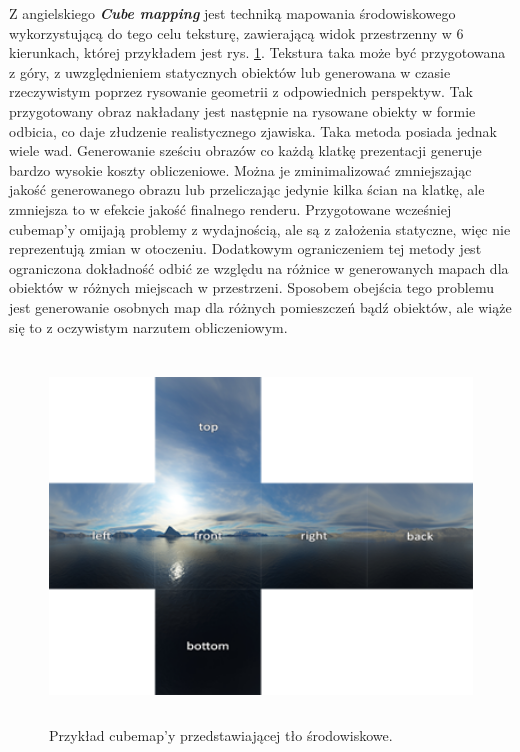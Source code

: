 \begin{itemize}
	Z angielskiego \emph{\textbf{Cube mapping}} jest techniką mapowania środowiskowego wykorzystującą do tego celu teksturę, zawierającą widok przestrzenny w 6 kierunkach, której przykładem jest rys. \ref{intro-cubemap}. Tekstura taka może być przygotowana z góry, z uwzględnieniem statycznych obiektów lub generowana w czasie rzeczywistym poprzez rysowanie geometrii z odpowiednich perspektyw. Tak przygotowany obraz nakładany jest następnie na rysowane obiekty w formie odbicia, co daje złudzenie realistycznego zjawiska.
	Taka metoda posiada jednak wiele wad. Generowanie sześciu obrazów co każdą klatkę prezentacji generuje bardzo wysokie koszty obliczeniowe. Można je zminimalizować zmniejszając jakość generowanego obrazu lub przeliczając jedynie kilka ścian na klatkę, ale zmniejsza to w efekcie jakość finalnego renderu. Przygotowane wcześniej cubemap'y omijają problemy z wydajnością, ale są z założenia statyczne, więc nie reprezentują zmian w otoczeniu. Dodatkowym ograniczeniem tej metody jest ograniczona dokładność odbić ze względu na różnice w generowanych mapach dla obiektów w różnych miejscach w przestrzeni. Sposobem obejścia tego problemu jest generowanie osobnych map dla różnych pomieszczeń bądź obiektów, ale wiąże się to z oczywistym narzutem obliczeniowym.
	
	\vfill
	\clearpage
	
	\begin{figure}[htbp]
		\centering
		\includegraphics[width=5.14673in,height=3.85833in]{images/10_cubemap_environment.png}
		\caption{Przykład cubemap'y przedstawiającej tło środowiskowe.}
		\label{intro-cubemap}
	\end{figure}


\end{itemize}

